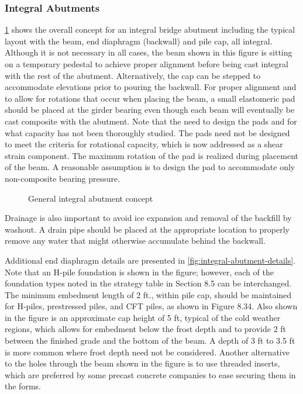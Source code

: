 \subsubsection{Integral Abutments}
\label{subsubsec:integral-abutments}
\cref{fig:general-integral-abutment-concept} shows the overall concept for an integral bridge abutment including the typical layout with the beam,
end diaphragm (backwall) and pile cap, all integral. Although it is not necessary in all cases, the beam shown in this
figure is sitting on a temporary pedestal to achieve proper alignment before being cast integral with the rest of the
abutment. Alternatively, the cap can be stepped to accommodate elevations prior to pouring the backwall. For proper alignment and to allow for rotations that occur when placing the beam, a small elastomeric pad should be placed at the
girder bearing even though each beam will eventually be cast composite with the abutment. Note that the need to
design the pads and for what capacity has not been thoroughly studied. The pads need not be designed to meet the
criteria for rotational capacity, which is now addressed as a shear strain component. The maximum rotation of the
pad is realized during placement of the beam. A reasonable assumption is to design the pad to accommodate only
non-composite bearing pressure.

\begin{figure}
  \caption{General integral abutment concept}
  \label{fig:general-integral-abutment-concept}
\end{figure}

Drainage is also important to avoid ice expansion and removal of the backfill by washout. A drain pipe should be
placed at the appropriate location to properly remove any water that might otherwise accumulate behind the backwall.

Additional end diaphragm details are presented in \cref{fig:integral-abutment-details}. Note that an H-pile foundation is shown in the
figure; however, each of the foundation types noted in the strategy table in Section 8.5 can be interchanged. The
minimum embedment length of 2 ft., within pile cap, should be maintained for H-piles, prestressed piles, and CFT
piles, as shown in Figure 8.34. Also shown in the figure is an approximate cap height of 5 ft, typical of the cold
weather regions, which allows for embedment below the frost depth and to provide 2 ft between the finished grade
and the bottom of the beam. A depth of 3 ft to 3.5 ft is more common where frost depth need not be considered.
Another alternative to the holes through the beam shown in the figure is to use threaded inserts, which are preferred
by some precast concrete companies to ease securing them in the forms.

